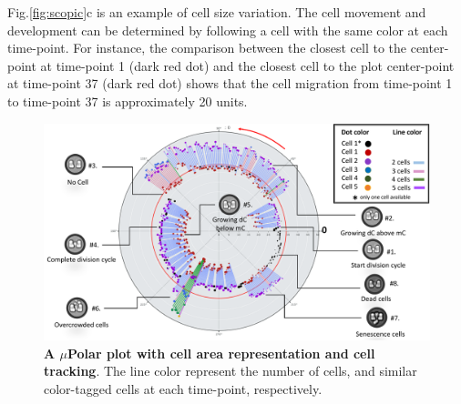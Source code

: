 \documentclass[conference]{IEEEtran}
\begin{document}
Fig.\ref{fig:scopic}c is an example of cell size variation. The cell movement and development can be determined by following a cell with the same color at each time-point. For instance, the comparison between the closest cell to the center-point at time-point 1 (dark red dot) and the closest cell to the plot center-point at time-point 37 (dark red dot) shows that the cell migration from time-point 1 to time-point 37 is approximately 20 units. 

 
\begin{figure}
\centering
\includegraphics[width=\textwidth,height=10 cm]{Patterns/explain.pdf}
\caption{ \textbf{ A $\mu$Polar plot with cell area representation and cell tracking}. The line color  represent the number of cells, and similar color-tagged cells at each time-point, respectively.
}
\label{fig:explain}
\end{figure}
\end{document}
